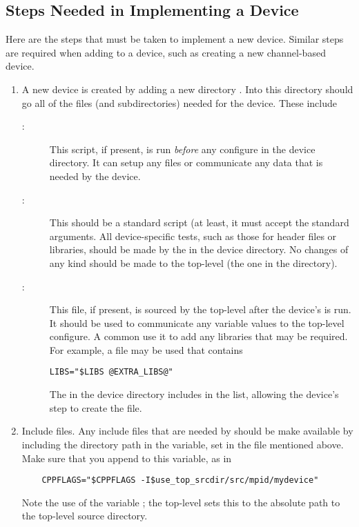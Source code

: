 \subsection{Steps Needed in Implementing a Device}
Here are the steps that must be taken to implement a new device.
Similar steps are required when adding to a device, such as creating a
new channel-based device.

\begin{enumerate}
\item A new device is created by adding a new directory
.  Into this directory should go all of the
files (and subdirectories) needed for the device.  These include

\begin{description}
\item[:]This script, if present, is run
\emph{before} any configure in the device directory.  It can setup any
files or communicate any data that is needed by the device.

\item[:]This should be a standard 
script (at least, it must accept the standard 
arguments.  All device-specific tests, such as those for header files
or libraries, should be made by the  in the device
directory.  No changes of any kind should be made to the top-level
 (the one in the  directory).

\item[:]This file, if present, is sourced by the
top-level  after the device's  is run.
It should be used to communicate any  
variable values to the top-level configure.  A common use it to add
any libraries that may be required.  For example, a file
 may be used that contains
\begin{verbatim}
LIBS="$LIBS @EXTRA_LIBS@"
\end{verbatim}
The  in the device directory includes 
in the  list, allowing the device's  step to
create the  file.
\end{description}

\item Include files.  
Any include files that are needed by  should be make
available by including the directory path in the 
variable, set in the  file mentioned above.  Make
sure that you append to this variable, as in 
\begin{verbatim}
    CPPFLAGS="$CPPFLAGS -I$use_top_srcdir/src/mpid/mydevice"
\end{verbatim}
Note the use of the variable ; the top-level
 sets this to the absolute path to the top-level
source directory.


\end{enumerate}
